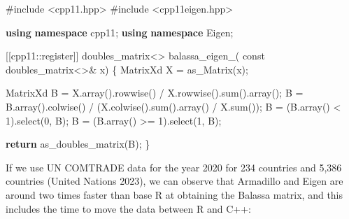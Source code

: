 \documentclass[12pt]{article}
\newenvironment{Shaded}{\begin{snugshade}}{\end{snugshade}}
\newcommand{\AttributeTok}[1]{\textcolor[rgb]{0.40,0.45,0.13}{#1}}
\newcommand{\ControlFlowTok}[1]{\textcolor[rgb]{0.00,0.23,0.31}{\textbf{#1}}}
\newcommand{\DecValTok}[1]{\textcolor[rgb]{0.68,0.00,0.00}{#1}}
\newcommand{\ImportTok}[1]{\textcolor[rgb]{0.00,0.46,0.62}{#1}}
\newcommand{\KeywordTok}[1]{\textcolor[rgb]{0.00,0.23,0.31}{\textbf{#1}}}
\newcommand{\NormalTok}[1]{\textcolor[rgb]{0.00,0.23,0.31}{#1}}
\newcommand{\OperatorTok}[1]{\textcolor[rgb]{0.37,0.37,0.37}{#1}}
\newcommand{\PreprocessorTok}[1]{\textcolor[rgb]{0.68,0.00,0.00}{#1}}
\newcommand{\VariableTok}[1]{\textcolor[rgb]{0.07,0.07,0.07}{#1}}
\begin{document}
\begin{Shaded}
\begin{Highlighting}[]
\PreprocessorTok{\#include }\ImportTok{\textless{}cpp11.hpp\textgreater{}}
\PreprocessorTok{\#include }\ImportTok{\textless{}cpp11eigen.hpp\textgreater{}}

\KeywordTok{using} \KeywordTok{namespace}\NormalTok{ cpp11}\OperatorTok{;}
\KeywordTok{using} \KeywordTok{namespace}\NormalTok{ Eigen}\OperatorTok{;}

\OperatorTok{[[}\AttributeTok{cpp11}\OperatorTok{::}\AttributeTok{register}\OperatorTok{]]}\NormalTok{ doubles\_matrix}\OperatorTok{\textless{}\textgreater{}} \VariableTok{balassa\_eigen\_}\OperatorTok{(}
  \AttributeTok{const}\NormalTok{ doubles\_matrix}\OperatorTok{\textless{}\textgreater{}\&}\NormalTok{ x}\OperatorTok{)} \OperatorTok{\{}
\NormalTok{  MatrixXd X }\OperatorTok{=}\NormalTok{ as\_Matrix}\OperatorTok{(}\NormalTok{x}\OperatorTok{);}

\NormalTok{  MatrixXd B }\OperatorTok{=}\NormalTok{ X}\OperatorTok{.}\NormalTok{array}\OperatorTok{().}\NormalTok{rowwise}\OperatorTok{()} \OperatorTok{/}\NormalTok{ X}\OperatorTok{.}\NormalTok{rowwise}\OperatorTok{().}\NormalTok{sum}\OperatorTok{().}\NormalTok{array}\OperatorTok{();}
\NormalTok{  B }\OperatorTok{=}\NormalTok{ B}\OperatorTok{.}\NormalTok{array}\OperatorTok{().}\NormalTok{colwise}\OperatorTok{()} \OperatorTok{/} \OperatorTok{(}\NormalTok{X}\OperatorTok{.}\NormalTok{colwise}\OperatorTok{().}\NormalTok{sum}\OperatorTok{().}\NormalTok{array}\OperatorTok{()} \OperatorTok{/}\NormalTok{ X}\OperatorTok{.}\NormalTok{sum}\OperatorTok{());}
\NormalTok{  B }\OperatorTok{=} \OperatorTok{(}\NormalTok{B}\OperatorTok{.}\NormalTok{array}\OperatorTok{()} \OperatorTok{\textless{}} \DecValTok{1}\OperatorTok{).}\NormalTok{select}\OperatorTok{(}\DecValTok{0}\OperatorTok{,}\NormalTok{ B}\OperatorTok{);}
\NormalTok{  B }\OperatorTok{=} \OperatorTok{(}\NormalTok{B}\OperatorTok{.}\NormalTok{array}\OperatorTok{()} \OperatorTok{\textgreater{}=} \DecValTok{1}\OperatorTok{).}\NormalTok{select}\OperatorTok{(}\DecValTok{1}\OperatorTok{,}\NormalTok{ B}\OperatorTok{);}

  \ControlFlowTok{return}\NormalTok{ as\_doubles\_matrix}\OperatorTok{(}\NormalTok{B}\OperatorTok{);}
\OperatorTok{\}}
\end{Highlighting}
\end{Shaded}

If we use UN COMTRADE data for the year 2020 for 234 countries and 5,386
countries (United Nations 2023), we can observe that Armadillo and Eigen
are around two times faster than base R at obtaining the Balassa matrix,
and this includes the time to move the data between R and C++:
\end{document}
